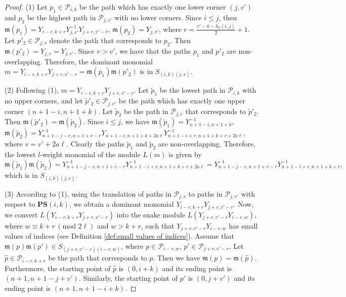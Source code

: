 \documentclass[12pt, reqno]{amsart}
\numberwithin{equation}{section}
\begin{document}
{\begin{proof}
(1) Let $p_1 \in \mathscr{P}_{i,k}$ be the path which has exactly one lower corner $(j, v')$ and $p_2$ be the highest path in $\mathscr{P}_{j,v'}$ with no lower corners. Since $i\leq j$, then $\mathfrak{m}(p_1)=Y_{i-r,k+r}Y_{j,v'}^{-1}Y_{j+r,v'-r}$, $\mathfrak{m}(p_2)=Y_{j,v'}$, where $r=\frac{v'-k-h_0(i,j)}2+1$. Let $p'_2\in\mathscr{P}_{j,v}$ denote the path that corresponds to $p_2$. Then $\mathfrak{m}(p'_2)=Y_{j,v}=Y_{j,v'}$. Since $v>v'$, we have that the paths $p_1$ and $p'_2$ are non-overlapping. Therefore, the dominant monomial $m=Y_{i-r,k+r}Y_{j+r,v'-r}=\mathfrak{m}(p_1)\mathfrak{m}(p'_2)$ is in $S_{(i,k)(j,v)}$.

(2) Following (1), $m=Y_{i-r,k+r}Y_{j+r,v'-r}$. Let $\widetilde{p}_1$ be the lowest path in $\mathscr{P}_{i,k}$ with no upper corners, and let $\widetilde{p}'_2\in \mathscr{P}_{j,v'}$ be the path which has exactly one upper corner $(n+1-i,n+1+k)$. Let $\widetilde{p}_2$ be the path in $\mathscr{P}_{j,v}$ that corresponds to $\widetilde{p}'_2$. Then $\mathfrak{m}(\widetilde{p}'_2)=\mathfrak{m}(\widetilde{p}_2)$. Since $i\leq j$, we have $\mathfrak{m}(\widetilde{p}_1)=Y_{n+1-i,n+1+k}^{-1}$, $\mathfrak{m}(\widetilde{p}_2)=Y_{n+1-j-r,n+1+v-r}^{-1}Y_{n+1-i,n+1+k+2a \ell}Y_{n+1-i+r,n+1+k+r+2a \ell}^{-1}$, where $v=v'+2a \ell$. Clearly the paths $\widetilde{p}_1$ and $\widetilde{p}_2$ are non-overlapping. Therefore, the lowest $l$-weight monomial of the module $L(m)$ is given by
\[
\mathfrak{m}(\widetilde{p}_1)\mathfrak{m}(\widetilde{p}_2)=Y_{n+1-j-r,n+1+v-r}^{-1}Y_{n+1-i+r,n+1+k+r+2a \ell}^{-1}=Y_{n+1-j-r,n+1+v-r}^{-1}Y_{n+1-i+r,n+1+k+r}^{-1},
\]
which is in $S_{(i,k)(j,v)}$. 


(3) According to (1), using the translation of paths in $\mathscr{P}_{j,v}$ to paths in $\mathscr{P}_{j,v'}$ with respect to $\mathbf{PS}(i,k)$, we obtain a dominant monomial $Y_{i-r,k+r}Y_{j+r,v'-r}$. Now, we convert $L(Y_{i-r,k+r}Y_{j+r,v'-r})$ into the snake module $L(Y_{j+r,v'-r}Y_{i-r,w})$, where $w\equiv k+r\, (\text{mod } 2 \ell)$ and $w> k+r$, such that $Y_{j+r,v'-r}Y_{i-r,w}$ has small values of indices (see Definition \ref{def:small values of indices}). Assume that $\mathfrak{m}(p)\mathfrak{m}(p')\in S_{(j+r,v'-r)(i-r,w)}$, where $p\in \mathscr{P}_{i-r,w}$, $p'\in \mathscr{P}_{j+r,v'-r}$. Let $\hat{p} \in \mathscr{P}_{i-r,k+r}$ be the path that corresponds to $p$. Then we have $\mathfrak{m}(p)=\mathfrak{m}(\hat{p})$. Furthermore, the starting point of $\hat{p}$ is $(0,i+k)$ and its ending point is $(n+1,n+1-j+v')$. Similarly, the starting point of $p'$ is $(0,j+v')$ and its ending point is $(n+1,n+1-i+k)$.



\end{proof}}
\end{document}
